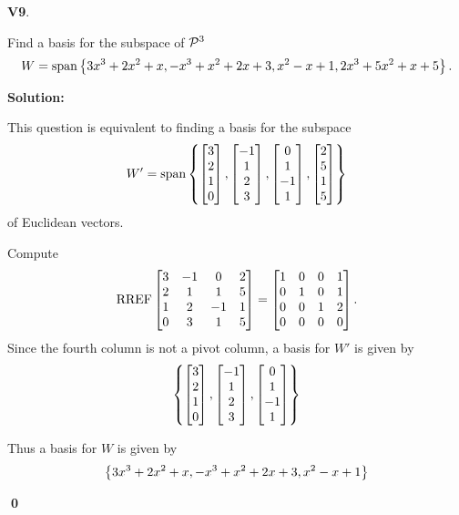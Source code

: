 \documentclass{article}
\newenvironment{problem}[1]
{
  \begin{flushleft}
  \textbf{#1}.
  \ignorespaces
}
{
  \end{flushleft}
}
\newenvironment{solution}
{
  \ignorespaces
  \textbf{Solution:}
}
{
  \ignorespacesafterend
  \begin{flushright}
  {\bfseries \qed}
  \end{flushright}
}
\begin{document}
\begin{problem}{V9}
Find a basis for the subspace of \(\P^3\)
\[W=\vspan\setList{3x^3+2x^2+x,-x^3+x^2+2x+3,x^2-x+1,2x^3+5x^2+x+5}.\]
\end{problem}
\begin{solution}
This question is equivalent to finding a basis for the subspace
\[
  W' = \vspan \setList{
  \begin{bmatrix} 3\\2\\1\\0\end{bmatrix},
  \begin{bmatrix} -1\\1\\2\\3\end{bmatrix},
  \begin{bmatrix} 0\\1\\-1\\1\end{bmatrix},
  \begin{bmatrix} 2\\5\\1\\5\end{bmatrix}
  }
\]
of Euclidean vectors.

Compute
\[\RREF \begin{bmatrix} 3 & -1 & 0 & 2 \\ 2 & 1 & 1 & 5 \\ 1 & 2 & -1 & 1 \\ 0 & 3 & 1 & 5 \end{bmatrix} =
\begin{bmatrix} 1 & 0 & 0 & 1 \\ 0 & 1 & 0 & 1 \\ 0 & 0 & 1 & 2 \\ 0 & 0 & 0 & 0 \end{bmatrix}.\]
Since the fourth column is not a pivot column, a basis for \(W'\) is given by
\[
  \setList{
  \begin{bmatrix} 3\\2\\1\\0\end{bmatrix},
  \begin{bmatrix} -1\\1\\2\\3\end{bmatrix},
  \begin{bmatrix} 0\\1\\-1\\1\end{bmatrix}
  }
\]

Thus a basis for \(W\) is given by
\[
  \setList{3x^3+2x^2+x,-x^3+x^2+2x+3,x^2-x+1}
\]
\end{solution}
\end{document}

